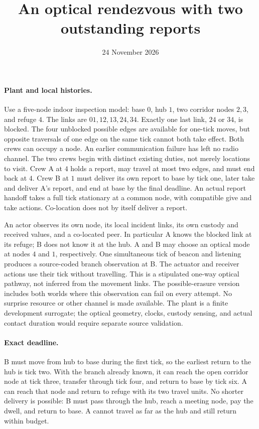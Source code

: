 \documentclass[11pt]{article}
\title{An optical rendezvous with two outstanding reports}
\date{24 November 2026}
\begin{document}
\maketitle
\paragraph{Plant and local histories.}
Use a five-node indoor inspection model: base \(0\), hub \(1\),
two corridor nodes \(2,3\), and refuge \(4\). The links are
\(01,12,13,24,34\). Exactly one last link, \(24\) or \(34\), is
blocked. The four unblocked possible edges are available for one-tick
moves, but opposite traversals of one edge on the same tick cannot
both take effect. Both crews can occupy a node. An earlier
communication failure has left no radio channel. The two crews
begin with distinct existing duties, not merely locations to visit.
Crew A at \(4\) holds a report, may travel at most two edges, and
must end back at \(4\). Crew B at \(1\) must deliver its own report
to base by tick one, later take and deliver A's report, and end
at base by the final deadline. An actual report handoff takes a
full tick stationary at a common node, with compatible give and take
actions. Co-location does not by itself deliver a report.

An actor observes its own node, its local incident links, its own
custody and received values, and a co-located peer. In particular
A knows the blocked link at its refuge; B does not know it at the hub.
A and B may choose an optical mode at nodes \(4\) and \(1\),
respectively. One simultaneous tick of beacon and listening
produces a source-coded branch observation at B. The actuator and
receiver actions use their tick without travelling. This is a stipulated
one-way optical pathway, not inferred from the movement links.
The possible-erasure version includes both worlds where this observation
can fail on every attempt. No surprise resource or other channel is
made available. The plant is a finite development surrogate; the
optical geometry, clocks, custody sensing, and actual contact duration
would require separate source validation.

\paragraph{Exact deadline.}
B must move from hub to base during the first tick, so the earliest
return to the hub is tick two. With the branch already known, it can
reach the open corridor node at tick three, transfer through tick four,
and return to base by tick six. A can reach that node and return to
refuge with its two travel units. No shorter delivery is possible:
B must pass through the hub, reach a meeting node, pay the dwell,
and return to base. A cannot travel as far as the hub and still return
within budget.
\end{document}
